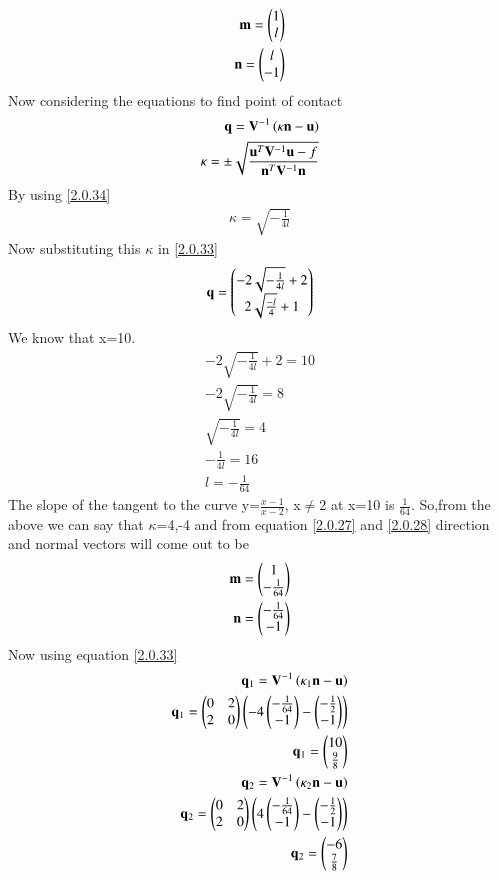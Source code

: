 \documentclass[journal,12pt,twocolumn]{IEEEtran}
\begin{document}
\begin{align}
\mathbf{m}=\begin{pmatrix}1\\l\end{pmatrix}\label{2.0.27}\\
\mathbf{n}=\begin{pmatrix}l\\-1\end{pmatrix}\label{2.0.28}
\end{align}$
$Now considering the equations to find point of contact
\begin{align} \mathbf{q} = \mathbf{V}^{-1}\left(\kappa \mathbf{n}-\mathbf{u}\right)\label{2.0.33}
\\
\kappa = \pm \sqrt{\frac{\mathbf{u}^T\mathbf{V}^{-1}\mathbf{u}-f}{\mathbf{n}^T\mathbf{V}^{-1}\mathbf{n}}} \label{2.0.34}
\end{align}$
$By using \eqref{2.0.34}
\begin{align}
\kappa=\sqrt{-\frac{1}{4l}}
\end{align}
Now substituting this $\kappa$ in \eqref{2.0.33}
\begin{align}
\mathbf{q}=\begin{pmatrix}-2\sqrt{-\frac{1}{4l}}+2\\2\sqrt{\frac{-l}{4}}+1\end{pmatrix}
\end{align}
We know that x=10.
\begin{align}
-2\sqrt{-\frac{1}{4l}}+2=10\\
-2\sqrt{-\frac{1}{4l}}=8\\
\sqrt{-\frac{1}{4l}}=4\\
-\frac{1}{4l}=16\\
l=-\frac{1}{64}
\end{align}$
$The slope of the tangent to the curve y=$\frac{x-1}{x-2}$, x$\not=$2 at x=10 is $\frac{1}{64}$.
So,from the above we can say that $\kappa$=4,-4 and from equation \eqref{2.0.27} and \eqref{2.0.28} direction and normal vectors will come out to be
\begin{align}
\mathbf{m}=\begin{pmatrix}1\\-\frac{1}{64}\end{pmatrix}\\
\mathbf{n}=\begin{pmatrix}-\frac{1}{64}\\-1\end{pmatrix}
\end{align}
Now using equation \eqref{2.0.33}
\begin{align}
\mathbf{q}_1 = \mathbf{V}^{-1}\left(\kappa_1 \mathbf{n}-\mathbf{u}\right)\\
\mathbf{q}_1 = \begin{pmatrix}0&2\\2&0\end{pmatrix}\left(-4 \begin{pmatrix}-\frac{1}{64}\\-1\end{pmatrix}-\begin{pmatrix}-\frac{1}{2}\\-1\end{pmatrix}\right)\\
\mathbf{q}_1=\begin{pmatrix}10\\ \frac{9}{8}\end{pmatrix}\\
\mathbf{q}_2 = \mathbf{V}^{-1}\left(\kappa_2 \mathbf{n}-\mathbf{u}\right)\\
\mathbf{q}_2 = \begin{pmatrix}0&2\\2&0\end{pmatrix}\left(4 \begin{pmatrix}-\frac{1}{64}\\-1\end{pmatrix}-\begin{pmatrix}-\frac{1}{2}\\-1\end{pmatrix}\right)\\
\mathbf{q}_2=\begin{pmatrix}-6\\ \frac{7}{8}\end{pmatrix}\\
\end{align}
\end{document}

